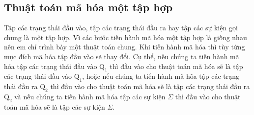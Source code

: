 \documentclass[a4paper,13pt,oneside,openany]{book}
\newenvironment{megaalgorithm}[1][htb]
{\renewcommand{\algorithmcfname}{Thuật toán}%
	\begin{algorithm}[#1]%
}{\end{algorithm}}
\begin{document}
\begin{flushleft}
		\subsection{Thuật toán mã hóa một tập hợp}
		Tập các trạng thái đầu vào, tập các trạng thái đầu ra hay tập các sự kiện gọi chung là một tập hợp. Vì các bước tiến hành mã hóa một tập hợp là giống nhau nên em chỉ trình bày một thuật toán chung. Khi tiến hành mã hóa thì tùy từng mục đích mã hóa tập đầu vào sẽ thay đổi. Cụ thể, nếu chúng ta tiến hành mã hóa tập các trạng thái đầu vào $\textrm{Q}_1$ thì đầu vào cho thuật toán mã hóa sẽ là tập các trạng thái đầu vào $\textrm{Q}_1$, hoặc nếu chúng ta tiến hành mã hõa tập các trạng thái đầu ra $\textrm{Q}_2$ thì đầu vào cho thuật toán mã hóa sẽ là tập các trạng thái đầu ra $\textrm{Q}_2$ và nếu chúng ta tiến hành mã hóa tập các sự kiện $\Sigma$ thì đầu vào cho thuật toán mã hóa sẽ là tập các sự kiện $\Sigma$.\\
		\begin{megaalgorithm}[H]
			\SetAlgoLined
			\DontPrintSemicolon
				

\end{megaalgorithm}
\end{flushleft}
\end{document}
